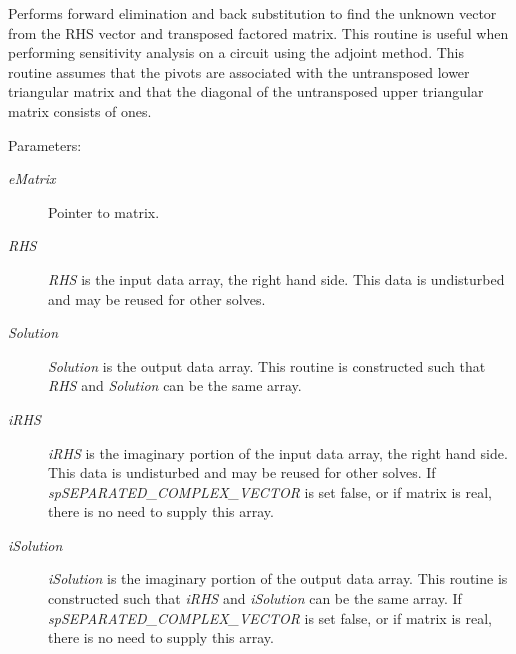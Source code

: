 Performs forward elimination and back substitution to find the unknown vector from the RHS vector and transposed factored matrix. This routine is useful when performing sensitivity analysis on a circuit using the adjoint method. This routine assumes that the pivots are associated with the untransposed lower triangular matrix and that the diagonal of the untransposed upper triangular matrix consists of ones.\begin{Desc}
\item[Parameters: ]\par
\begin{description}
\item[{\em 
e\-Matrix}]Pointer to matrix. \item[{\em 
RHS}]{\em RHS} is the input data array, the right hand side. This data is undisturbed and may be reused for other solves. \item[{\em 
Solution}]{\em Solution} is the output data array. This routine is constructed such that {\em RHS} and {\em Solution} can be the same array. \item[{\em 
i\-RHS}]{\em i\-RHS} is the imaginary portion of the input data array, the right hand side. This data is undisturbed and may be reused for other solves. If {\em sp\-SEPARATED\_\-COMPLEX\_\-VECTOR} is set false, or if matrix is real, there is no need to supply this array. \item[{\em 
i\-Solution}]{\em i\-Solution} is the imaginary portion of the output data array. This routine is constructed such that {\em i\-RHS} and {\em i\-Solution} can be the same array. If {\em sp\-SEPARATED\_\-COMPLEX\_\-VECTOR} is set false, or if matrix is real, there is no need to supply this array. \end{description}
\end{Desc}
